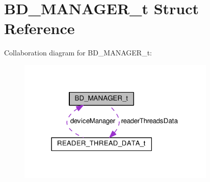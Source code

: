 \hypertarget{structBD__MANAGER__t}{}\section{B\+D\+\_\+\+M\+A\+N\+A\+G\+E\+R\+\_\+t Struct Reference}
\label{structBD__MANAGER__t}


Collaboration diagram for B\+D\+\_\+\+M\+A\+N\+A\+G\+E\+R\+\_\+t\+:
\nopagebreak
\begin{figure}[H]
\begin{center}
\leavevmode
\includegraphics[width=267pt]{structBD__MANAGER__t__coll__graph}
\end{center}
\end{figure}
